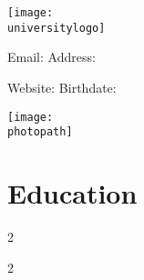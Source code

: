 \documentclass[10pt, a4paper]{article}
\newenvironment{twocolentry}[2][]{
    \onecolentry
    \def\secondColumn{#2}
    \setcolumnwidth{\fill, 4.5 cm}
    \begin{paracol}{2}
}{
    \switchcolumn \raggedleft \secondColumn
    \end{paracol}
    \endonecolentry
} %
\newenvironment{header}{
    \setlength{\topsep}{0pt}\par\kern\topsep\centering\linespread{1.5}
}{
    \par\kern\topsep
} %
\begin{document}
    \setlength{\baselineskip}{1.2\baselineskip}
    \justifying
    
    \newcommand{\AND}{\unskip
        \cleaders\copy\ANDbox\hskip\wd\ANDbox
        \ignorespaces
    }
    \newsavebox\ANDbox
    \sbox\ANDbox{$|$}

    \begin{header}
        \begin{minipage}[t]{0.12\textwidth}
            \vspace{0pt}
            \texttt{[image: \\universitylogo]}
        \end{minipage}%
        \hfill
        \begin{minipage}[t]{0.65\textwidth}
            \vspace{0.5cm}
            \centering
            \fontsize{24 pt}{24 pt}\selectfont \textbf{\fullname}
            
            \vspace{0.4cm}
            
            \fontsize{10 pt}{12 pt}\selectfont
            Email: \email \textbar{} Address: \address
            
            \vspace{0.1cm}
            Website: \website \textbar{} Birthdate: \birthdate
        \end{minipage}%
        \hfill
        \begin{minipage}[t]{0.18\textwidth}
            \vspace{0pt}
            \raggedleft
            \texttt{[image: \\photopath]}
        \end{minipage}
    \end{header}

    \vspace{5 pt - 0.3 cm}

    \section{Education}

        \begin{twocolentry}{
            \currentperiod
        }
            \textbf{\currentuniversity}\end{twocolentry}

        \begin{twocolentry}{
            \currentlocation
        }
            \currentdegree \\ \currentfaculty\end{twocolentry}
\end{document}
